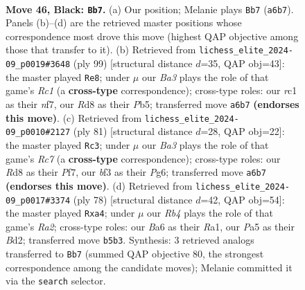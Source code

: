\documentclass[11pt]{article}
\begin{document}
\clearpage

\begin{figure}[p]\centering
\begin{subfigure}{0.46\textwidth}\centering
\resizebox{\linewidth}{!}{%
\newchessgame
\chessboard[
  setfen={3r2k1/5p1p/b7/pr6/3p2P1/1P3B1N/1R1K3P/2R5 b - - 7 46},
  showmover=false,
  pgfstyle=straightmove, color=movearrow, markmove={a6-b7}
]}
\caption{}
\end{subfigure}\hfill
\begin{subfigure}{0.46\textwidth}\centering
\resizebox{\linewidth}{!}{%
\newchessgame
\chessboard[
  setfen={2r5/p1r1PN2/k7/1p4P1/8/8/P1p2K1P/2B1R3 b - - 2 50},
  showmover=false,
  pgfstyle=straightmove, color=movearrow, markmove={c8-e8}
]}
\caption{}
\end{subfigure}
\\[4pt]
\begin{subfigure}{0.46\textwidth}\centering
\resizebox{\linewidth}{!}{%
\newchessgame
\chessboard[
  setfen={1R6/1P3pk1/6p1/8/3P3P/6P1/brr5/4R1KB b - - 0 41},
  showmover=false,
  pgfstyle=straightmove, color=movearrow, markmove={c2-c3}
]}
\caption{}
\end{subfigure}\hfill
\begin{subfigure}{0.46\textwidth}\centering
\resizebox{\linewidth}{!}{%
\newchessgame
\chessboard[
  setfen={r1r5/4kp2/2P3p1/4p1P1/p1P5/5PK1/R2B4/R7 w - - 1 40},
  showmover=false,
  pgfstyle=straightmove, color=movearrow, markmove={a2-a4}
]}
\caption{}
\end{subfigure}
\caption{\textbf{Move 46, Black: \texttt{Bb7}.} (a) Our position; Melanie plays \texttt{Bb7} (\texttt{a6b7}). Panels (b)--(d) are the retrieved master positions whose correspondence most drove this move (highest QAP objective among those that transfer to it). (b) Retrieved from \texttt{lichess\_elite\_2024-09\_p0019\#3648} (ply 99) [structural distance $d$=35, QAP obj=43]: the master played \texttt{Re8}; under $\mu$ our \emph{Ba3} plays the role of that game's \emph{Rc1} (a \textbf{cross-type} correspondence); cross-type roles: our \emph{r}c1 as their \emph{n}f7, our \emph{R}d8 as their \emph{P}b5; transferred move \texttt{a6b7} \textbf{(endorses this move)}. (c) Retrieved from \texttt{lichess\_elite\_2024-09\_p0010\#2127} (ply 81) [structural distance $d$=28, QAP obj=22]: the master played \texttt{Rc3}; under $\mu$ our \emph{Ba3} plays the role of that game's \emph{Rc7} (a \textbf{cross-type} correspondence); cross-type roles: our \emph{R}d8 as their \emph{P}f7, our \emph{b}f3 as their \emph{P}g6; transferred move \texttt{a6b7} \textbf{(endorses this move)}. (d) Retrieved from \texttt{lichess\_elite\_2024-09\_p0017\#3374} (ply 78) [structural distance $d$=42, QAP obj=54]: the master played \texttt{Rxa4}; under $\mu$ our \emph{Rb4} plays the role of that game's \emph{Ra2}; cross-type roles: our \emph{B}a6 as their \emph{R}a1, our \emph{P}a5 as their \emph{B}d2; transferred move \texttt{b5b3}. Synthesis: 3 retrieved analogs transferred to \texttt{Bb7} (summed QAP objective 80, the strongest correspondence among the candidate moves); Melanie committed it via the \texttt{search} selector.}
\label{fig:thought-m91}
\end{figure}
\end{document}
